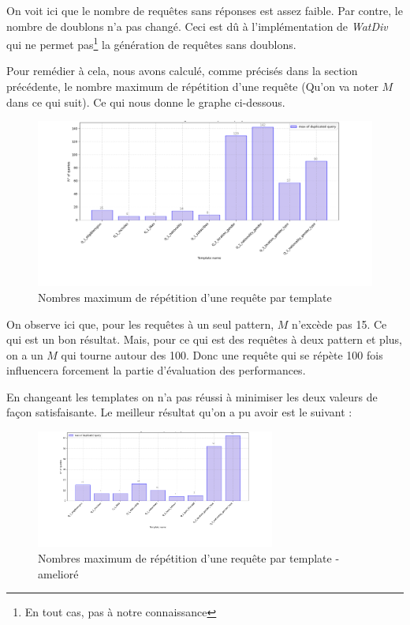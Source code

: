 \documentclass[12pt,titlepage]{article}
\begin{document}
On voit ici que le nombre de requêtes sans réponses est assez faible. Par contre, le nombre de doublons n'a pas changé. Ceci est dû à l'implémentation de \textit{WatDiv} qui ne permet pas\footnote{En tout cas, pas à notre connaissance} la génération de requêtes sans doublons.

Pour remédier à cela, nous avons calculé, comme précisés dans la section précédente, le nombre maximum de répétition d'une requête (Qu'on va noter $M$ dans ce qui suit). Ce qui nous donne le graphe ci-dessous.

\begin{figure}[!h]
\centering
\includegraphics[width=1.\textwidth]{img/max_dup.png}
\caption{Nombres maximum de répétition d'une requête par template}
\label{maxdup}
\end{figure}

On observe ici que, pour les requêtes à un seul pattern, $M$ n'excède pas 15. Ce qui est un bon résultat. Mais, pour ce qui est des requêtes à deux pattern et plus, on a un $M$ qui tourne autour des 100. Donc une requête qui se répète 100 fois influencera forcement la partie d'évaluation des performances.

En changeant les templates on n'a pas réussi à minimiser les deux valeurs de façon satisfaisante. Le meilleur résultat qu'on a pu avoir est le suivant :

\begin{figure}[!h]
\centering
\includegraphics[width=0.70\textwidth]{img/max_dup_final.png}
\caption{Nombres maximum de répétition d'une requête par template - amelioré}
\label{maxdupfinal}
\end{figure}
\end{document}
